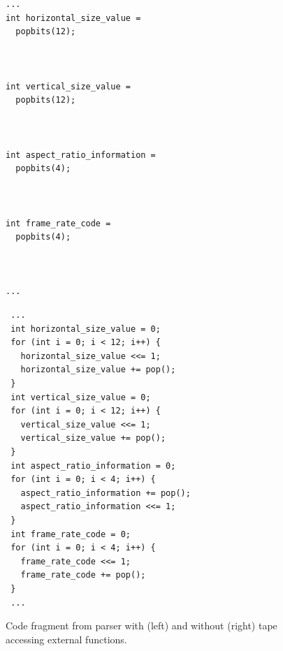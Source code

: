 \begin{figure}
  \begin{footnotesize} 
  \begin{center}
  \begin{minipage}{4.7in}
    \setlength{\columnseprule}{1pt}
    \begin{multicols}{2}
     \begin{minipage}{3in}
      \begin{verbatim}
...
int horizontal_size_value = 
  popbits(12);



int vertical_size_value = 
  popbits(12);



int aspect_ratio_information = 
  popbits(4);



int frame_rate_code = 
  popbits(4);



...
      \end{verbatim}
     \end{minipage} 

     \begin{minipage}{4in}
      \begin{verbatim}
 ...
 int horizontal_size_value = 0;
 for (int i = 0; i < 12; i++) {
   horizontal_size_value <<= 1;
   horizontal_size_value += pop();
 }
 int vertical_size_value = 0;
 for (int i = 0; i < 12; i++) {
   vertical_size_value <<= 1;
   vertical_size_value += pop();
 }
 int aspect_ratio_information = 0;
 for (int i = 0; i < 4; i++) {
   aspect_ratio_information += pop();
   aspect_ratio_information <<= 1;
 }
 int frame_rate_code = 0;
 for (int i = 0; i < 4; i++) {
   frame_rate_code <<= 1;
   frame_rate_code += pop();
 }
 ...
        \end{verbatim}
     \end{minipage}
    \end{multicols}
  \end{minipage}
  \end{center}
  \end{footnotesize}

  \caption{Code fragment from parser with (left) and without (right) tape accessing external functions.}
  \label{fig:mpegbitpopexample}
\end{figure}


